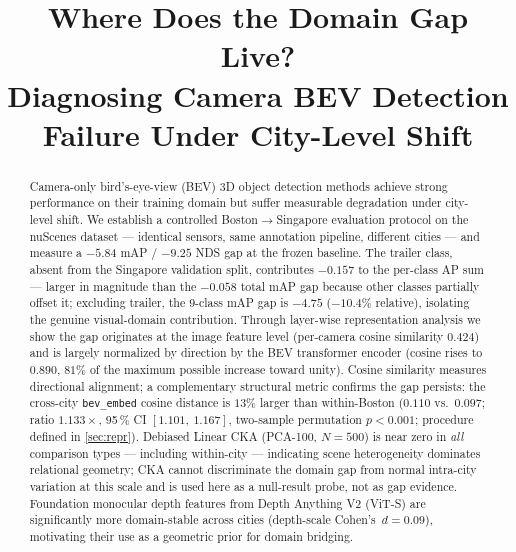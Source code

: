 \documentclass[letterpaper, 10pt, journal]{IEEEtran}
\begin{document}
\title{Where Does the Domain Gap Live?\\
Diagnosing Camera BEV Detection Failure Under City-Level Shift}

\author{%
}

\maketitle

\begin{abstract}
Camera-only bird's-eye-view (BEV) 3D object detection methods achieve strong
performance on their training domain but suffer measurable degradation under
city-level shift.
We establish a controlled Boston$\to$Singapore evaluation protocol on the nuScenes
dataset --- identical sensors, same annotation pipeline, different cities ---
and measure a $-5.84$ mAP / $-9.25$ NDS gap at the frozen baseline.
The trailer class, absent from the Singapore validation split, contributes
$-0.157$ to the per-class AP sum --- larger in magnitude than the $-0.058$
total mAP gap because other classes partially offset it; excluding trailer,
the 9-class mAP gap is $-4.75$ ($-10.4\%$ relative), isolating the genuine
visual-domain contribution.
Through layer-wise representation analysis we show the gap originates at the image
feature level (per-camera cosine similarity $0.424$) and is largely normalized by
direction by the BEV transformer encoder (cosine rises to $0.890$, $81\%$ of the
maximum possible increase toward unity).
Cosine similarity measures directional alignment; a complementary structural metric
confirms the gap persists: the cross-city \texttt{bev\_embed} cosine distance is
$13\%$ larger than within-Boston ($0.110$ vs.\ $0.097$; ratio $1.133\times$,
95\,\% CI $[1.101,\ 1.167]$, two-sample permutation $p < 0.001$;
procedure defined in \cref{sec:repr}).
Debiased Linear CKA (PCA-100, $N{=}500$) is near zero in \emph{all} comparison
types --- including within-city --- indicating scene heterogeneity dominates
relational geometry; CKA cannot discriminate the domain gap from normal intra-city
variation at this scale and is used here as a null-result probe, not as gap evidence.
Foundation monocular depth features from Depth Anything V2 (ViT-S) are significantly
more domain-stable across cities (depth-scale Cohen's~$d = 0.09$), motivating their
use as a geometric prior for domain bridging.

\end{abstract}
\end{document}
